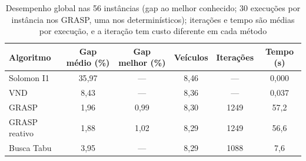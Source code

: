 \begin{table}[H]
\centering\singlespacing
\begin{minipage}{\textwidth}
\caption{Desempenho global nas 56 instâncias (gap ao melhor conhecido; 30 execuções por instância nos GRASP, uma nos determinísticos); iterações e tempo são médias por execução, e a iteração tem custo diferente em cada método}
\label{tab:overall}
\centering
\small\setlength{\tabcolsep}{4pt}
\begin{tabular}{lccccc}
\toprule
\textbf{Algoritmo} & \textbf{Gap médio (\%)} & \textbf{Gap melhor (\%)} & \textbf{Veículos} & \textbf{Iterações} & \textbf{Tempo (s)} \\
\midrule
Solomon I1 & 35{,}97 & --- & 8{,}46 & --- & 0{,}000 \\
VND & 8{,}43 & --- & 8{,}36 & --- & 0{,}037 \\
GRASP & 1{,}96 & 0{,}99 & 8{,}30 & 1249 & 57{,}2 \\
GRASP reativo & 1{,}88 & 1{,}02 & 8{,}29 & 1249 & 56{,}6 \\
Busca Tabu & 3{,}95 & --- & 8{,}29 & 1088 & 7{,}6 \\
\bottomrule
\end{tabular}
\end{minipage}
\end{table}

